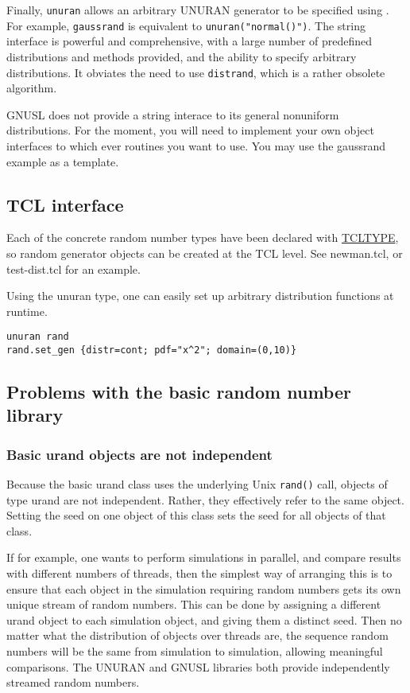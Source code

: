 Finally, \verb+unuran+ allows an arbitrary UNURAN generator to be
specified using .
For example, \verb+gaussrand+ is equivalent to
\verb+unuran("normal()")+. The string interface is powerful and
comprehensive, with a large number of predefined distributions and
methods provided, and the ability to specify arbitrary
distributions. It obviates the need to use \verb+distrand+, which is a
rather obsolete algorithm.

GNUSL does not provide a string interace to its general nonuniform
distributions. For the moment, you will need to implement your own
object interfaces to which ever routines you want to use. You may use
the gaussrand example as a template.

\subsection{TCL interface}

Each of the concrete random number types have been declared with
\hyperref{TCLTYPE}{TCLTYPE (See \S}{)}{TCLTYPE}, so
random generator objects can be created at the TCL level. See
newman.tcl, or test-dist.tcl for an example. 

Using the unuran type, one can easily set up arbitrary distribution
functions at runtime.
\begin{verbatim}
unuran rand
rand.set_gen {distr=cont; pdf="x^2"; domain=(0,10)}
\end{verbatim}

\subsection{Problems with the basic random number library}\label{basic RNG problems}

\subsubsection{Basic urand objects are not independent}

Because the basic urand class uses the underlying Unix \verb+rand()+
call, objects of type urand are not independent. Rather, they
effectively refer to the same object. Setting the seed on one object
of this class sets the seed for all objects of that class.

If for example, one wants to perform simulations in parallel, and
compare results with different numbers of threads, then the simplest
way of arranging this is to ensure that each object in the simulation
requiring random numbers gets its own unique stream of random
numbers. This can be done by assigning a different urand object to
each simulation object, and giving them a distinct seed. Then no
matter what the distribution of objects over threads are, the sequence
random numbers will be the same from simulation to simulation,
allowing meaningful comparisons. The UNURAN and GNUSL libraries both
provide independently streamed random numbers.

